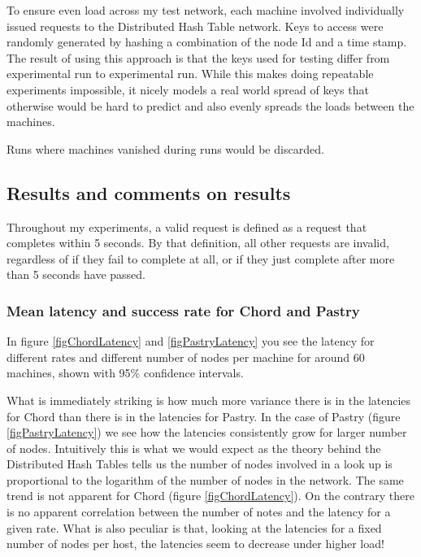 \mbox{}
To ensure even load across my test network, each machine involved individually issued requests to the Distributed Hash Table network.
Keys to access were randomly generated by hashing a combination of the node Id and a time stamp. The result of using this approach is that the keys used for testing differ from experimental run to experimental run. While this makes doing repeatable experiments impossible, it nicely models a real world spread of keys that otherwise would be hard to predict and also evenly spreads the loads between the machines.

Runs where machines vanished during runs would be discarded.


\subsection{Results and comments on results}
Throughout my experiments, a valid request is defined as a request that completes within 5 seconds. By that definition, all other requests are invalid, regardless of if they fail to complete at all, or if they just complete after more than 5 seconds have passed.

\subsubsection{Mean latency and success rate for Chord and Pastry}
In figure \ref{figChordLatency} and \ref{figPastryLatency} you see the latency for different rates and different number of nodes per machine for around 60 machines, shown with 95\% confidence intervals. 

What is immediately striking is how much more variance there is in the latencies for Chord than there is in the latencies for Pastry.
In the case of Pastry (figure \ref{figPastryLatency}) we see how the latencies consistently grow for larger number of nodes. Intuitively this is what we would expect as the theory behind the Distributed Hash Tables tells us the number of nodes involved in a look up is proportional to the logarithm of the number of nodes in the network. The same trend is not apparent for Chord (figure \ref{figChordLatency}). On the contrary there is no apparent correlation between the number of notes and the latency for a given rate. What is also peculiar is that, looking at the latencies for a fixed number of nodes per host, the latencies seem to decrease under higher load!

